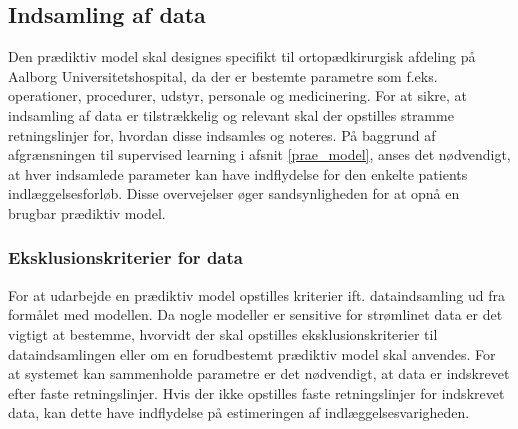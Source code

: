\subsection{Indsamling af data}
Den prædiktiv model skal designes specifikt til ortopædkirurgisk afdeling på Aalborg Universitetshospital, da der er bestemte parametre som f.eks. operationer, procedurer, udstyr, personale og medicinering. For at sikre, at indsamling af data er tilstrækkelig og relevant skal der opstilles stramme retningslinjer for, hvordan disse indsamles og noteres. På baggrund af afgrænsningen til supervised learning i afsnit \ref{prae_model}, anses det nødvendigt, at hver indsamlede parameter kan have indflydelse for den enkelte patients indlæggelsesforløb. Disse overvejelser øger sandsynligheden for at opnå en brugbar prædiktiv model. 




%


\subsubsection{Eksklusionskriterier for data} 
For at udarbejde en prædiktiv model opstilles kriterier ift. dataindsamling ud fra formålet med modellen. Da nogle modeller er sensitive for strømlinet data er det vigtigt at bestemme, hvorvidt der skal opstilles eksklusionskriterier til dataindsamlingen eller om en forudbestemt prædiktiv model skal anvendes.\cite{Kuhn2013}
For at systemet kan sammenholde parametre er det nødvendigt, at data er indskrevet efter faste retningslinjer. Hvis der ikke opstilles faste retningslinjer for indskrevet data, kan dette have indflydelse på estimeringen af indlæggelsesvarigheden.\cite{Kuhn2013} \\

